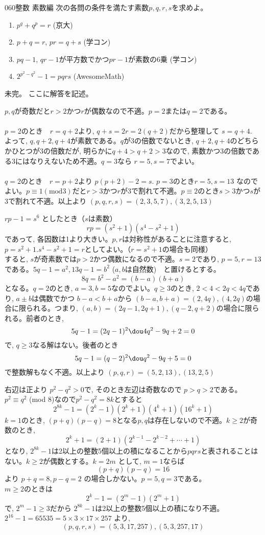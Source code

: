 \begin{thm}{060}{}{整数 素数編}
 次の各問の条件を満たす素数$p, q, r, s$を求めよ。
 \begin{enumerate}
  \item $p^q+q^p=r$ (京大)
  \item $p+q=r$, $pr=q+s$ (学コン)
  \item $pq-1$, $qr-1$が平方数でかつ$pr-1$が素数の6乗 (学コン)
  \item $2^{p^2-q^2}-1=pqrs$ (AwesomeMath)
 \end{enumerate}
\end{thm}
未完。
ここに解答を記述。

$p,q$が奇数だと$r>2$かつ$r$が偶数なので不適。$p=2$または$q=2$である。\\
\\
$p=2$のとき　$r=q+2$より, $q+s=2r=2(q+2)$だから整理して $s=q+4$.　よって, $q,q+2,q+4$が素数である。$q$が3の倍数でないとき, $q+2, q+4$のどちらかひとつが3の倍数だが, 明らかに$q+4>q+2>3$なので, 素数かつ3の倍数である3にはなりえないため不適。$q=3$なら $r=5, s=7$でよい。\\
\\
$q=2$のとき　$r=p+2$より $p(p+2)-2=s$. $p=3$のとき$r=5, s=13$ なのでよい。$p\equiv 1 　(\mbox{mod} 3)$だと$r>3$かつ$r$が3で割れて不適。$p\equiv 2$のとき$s>3$かつ$s$が3で割れて不適。以上より $(p,q,r,s)=(2,3,5,7), (3,2,5,13)$

$rp-1=s^6$ としたとき（$s$は素数）
\[rp=(s^2+1)(s^4-s^2+1)\]
であって, 各因数は1より大きい。$p,r$は対称性があることに注意すると, $p=s^2+1. s^4-s^2+1=r$としてよい。（$r=s^2+1$の場合も同様）\\
すると, $s$が奇素数では$p>2$かつ偶数になるので不適。$s=2$であり, $p=5, r=13$である。$5q-1=a^2, 13q-1=b^2$ ($a,b$は自然数)　と置けるとする。
\[8q=b^2-a^2=(b-a)(b+a)\]
となる。$q=2$のとき, $a=3, b=5$なのでよい。$q\geq 3$のとき, $2<4<2q<4q$であり, $a\pm b$は偶数でかつ $b-a<b+a$から $(b-a,b+a)=(2, 4q), (4,2q)$の場合に限られる。つまり, $(a,b)=(2q-1, 2q+1), (q-2, q+2)$の場合に限られる。前者のとき,
\[5q-1=(2q-1)^2 \dou 4q^2-9q+2=0\]
で, $q\geq 3$なる解はない。後者のとき
\[5q-1=(q-2)^2 \dou q^2-9q+5=0\]
で整数解もなく不適。以上より $(p,q,r)=(5,2,13), (13,2,5)$

右辺は正より $p^2-q^2>0$で, そのとき左辺は奇数なので $p>q>2$である。$p^2\equiv q^2$ (mod $8$)なので$p^2-q^2=8k$とすると
\[2^{8k}-1=(2^k-1)(2^k+1)(4^k+1)(16^k+1)\]
$k=1$のとき, $(p+q)(p-q)=8$となる$p,q$は存在しないので不適。$k\geq 2$が奇数のとき, 
\[2^k+1=(2+1)(2^{k-1}-2^{k-2}+\cdots +1)\]
となり, $2^{8k}-1$は2以上の整数5個以上の積になることから$pqrs$と表されることはない。$k\geq 2$が偶数とする。$k=2m$ として, $m=1$ならば 
\[(p+q)(p-q)=16\]
より $p+q=8, p-q=2$ の場合しかない。$p=5, q=3$である。\\
$m\geq 2$のときは
\[2^{k}-1=(2^m-1)(2^m+1)\]
で, $2^{m}-1\geq 3$だから $2^{8k}-1$は2以上の整数5個以上の積になり不適。\\
$2^{16}-1=65535=5\times 3\times 17\times 257$ より,
\[(p,q,r,s)=(5,3,17,257), (5,3,257,17)\]
